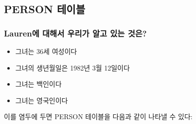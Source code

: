 \documentclass[11pt]{book}
\providecommand{\tightlist}{%
  \setlength{\itemsep}{0pt}\setlength{\parskip}{0pt}}
\theoremstyle{definition}
\theoremstyle{definition}
\theoremstyle{definition}
\theoremstyle{remark}
\begin{document}
\subsection{PERSON 테이블}\label{person}

\subsubsection*{Lauren에 대해서 우리가 알고 있는
것은?}\label{lauren-----}

\begin{itemize}
\tightlist
\item
  그녀는 36세 여성이다
\item
  그녀의 생년월일은 1982년 3월 12일이다
\item
  그녀는 백인이다
\item
  그녀는 영국인이다
\end{itemize}

이를 염두에 두면 PERSON 테이블을 다음과 같이 나타낼 수 있다:
\end{document}
